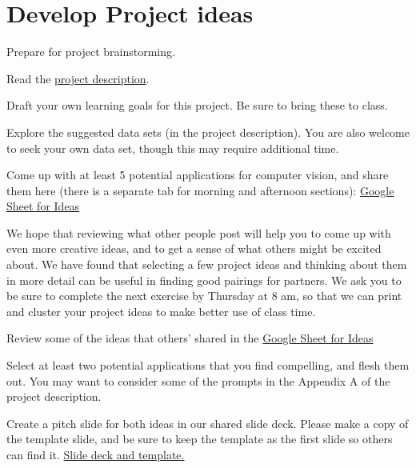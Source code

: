 \documentclass[assignment08_Solutions]{subfiles}
\begin{document}
\section{Develop Project ideas}

\begin{exercise}
Prepare for project brainstorming.
\bes
\item Read the \href{https://github.com/olincollege/MLfall2021/blob/master/Module\%201/m1_project/m1_project.pdf}{project description}.
\item Draft your own learning goals for this project. Be sure to bring these to class.
\item Explore the suggested data sets (in the project description). You are also welcome to seek your own data set, though this may require additional time.
\item Come up with at least 5 potential applications for computer vision, and share them here (there is a separate tab for morning and afternoon sections): \href{https://docs.google.com/spreadsheets/d/1TyzKsfdCvZEzfaYswfJSHiYH2JU73gd0KCIOwQijvFo/edit?usp=sharing}{Google Sheet for Ideas} 
\ees 
\end{exercise}
 
\vspace{1em}
We hope that reviewing what other people post will help you to come up with even more creative ideas, and to get a sense of what others might be excited about. We have found that selecting a few project ideas and thinking about them in more detail can be useful in finding good pairings for partners. We ask you to be sure to complete the next exercise by Thursday at 8 am, so that we can print and cluster your project ideas to make better use of class time.
\vspace{1em}
\begin{exercise}
\bes
\item Review some of the ideas that others' shared in the \href{https://docs.google.com/spreadsheets/d/1TyzKsfdCvZEzfaYswfJSHiYH2JU73gd0KCIOwQijvFo/edit?usp=sharing}{Google Sheet for Ideas} 
\item Select at least two potential applications that you find compelling, and flesh them out. You may want to consider some of the prompts in the Appendix A of the project description.
\item Create a pitch slide for both ideas in our shared slide deck. Please make a copy of the template slide, and be sure to keep the template as the first slide so others can find it. \href{https://docs.google.com/presentation/d/1f3u9lJXV9_DzKRhHH41kr8h3xQn4ex6SbpcNwyws9z4/edit?usp=sharing}{Slide deck and template.} 
\ees
\end{exercise}
\end{document}
